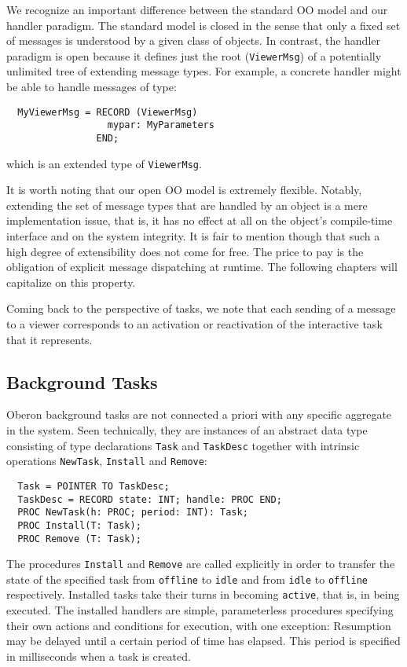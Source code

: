 We recognize an important difference between the standard OO model and our handler paradigm.
The standard model is closed in the sense that only a fixed set of messages is understood
by a given class of objects. In contrast, the handler paradigm is open because it defines
just the root (\verb|ViewerMsg|) of a potentially unlimited tree of extending message types.
For example, a concrete handler might be able to handle messages of type:
\begin{verbatim}
  MyViewerMsg = RECORD (ViewerMsg)
                  mypar: MyParameters
                END;
\end{verbatim}
which is an extended type of \verb|ViewerMsg|.

It is worth noting that our open OO model is extremely flexible. Notably, extending the set
of message types that are handled by an object is a mere implementation issue, that is, it
has no effect at all on the object’s compile-time interface and on the system integrity.
It is fair to mention though that such a high degree of extensibility does not come for free.
The price to pay is the obligation of explicit message dispatching at runtime.
The following chapters will capitalize on this property.

Coming back to the perspective of tasks, we note that each sending of a message to a viewer
corresponds to an activation or reactivation of the interactive task that it represents.

\subsection{Background Tasks}
Oberon background tasks are not connected a priori with any specific aggregate in the system.
Seen technically, they are instances of an abstract data type consisting of type declarations
\verb|Task| and \verb|TaskDesc| together with intrinsic operations \verb|NewTask|,
\verb|Install| and \verb|Remove|:
\begin{verbatim}
  Task = POINTER TO TaskDesc;
  TaskDesc = RECORD state: INT; handle: PROC END;
  PROC NewTask(h: PROC; period: INT): Task;
  PROC Install(T: Task);
  PROC Remove (T: Task);
\end{verbatim}
The procedures \verb|Install| and \verb|Remove| are called explicitly in order to transfer
the state of the specified task from \verb|offline| to \verb|idle| and from \verb|idle| to
\verb|offline| respectively. Installed tasks take their turns in becoming \verb|active|,
that is, in being executed. The installed handlers are simple, parameterless procedures
specifying their own actions and conditions for execution, with one exception:
Resumption may be delayed until a certain period of time has elapsed.
This period is specified in milliseconds when a task is created.

